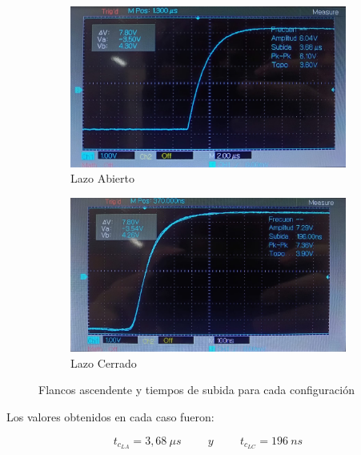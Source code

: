 \begin{figure}[H]
    \begin{center}
        \begin{subfigure}[b]{0.54\textwidth}
        \centering  
            \includegraphics[width=1\textwidth]{Imagenes/tcLA.jpeg}
        \caption{Lazo Abierto}
        \label{fig:tcLA}
    \end{subfigure}
    \hfill
    \begin{subfigure}[b]{0.54\textwidth}
        \centering
            \includegraphics[width=1\textwidth]{Imagenes/tcLC.jpeg}
        \caption{Lazo Cerrado}
        \label{fig:tcLC}
    \end{subfigure}
    \caption{Flancos ascendente y tiempos de subida para cada configuración}
    \label{fig:tc}
    \end{center}
\end{figure}

Los valores obtenidos en cada caso fueron:

\begin{equation*}
    t_{c_{LA}} = 3,68 ~\mu s
    \hspace{1cm} y \hspace{1cm}
    t_{c_{LC}} = 196 ~ns
\end{equation*}

